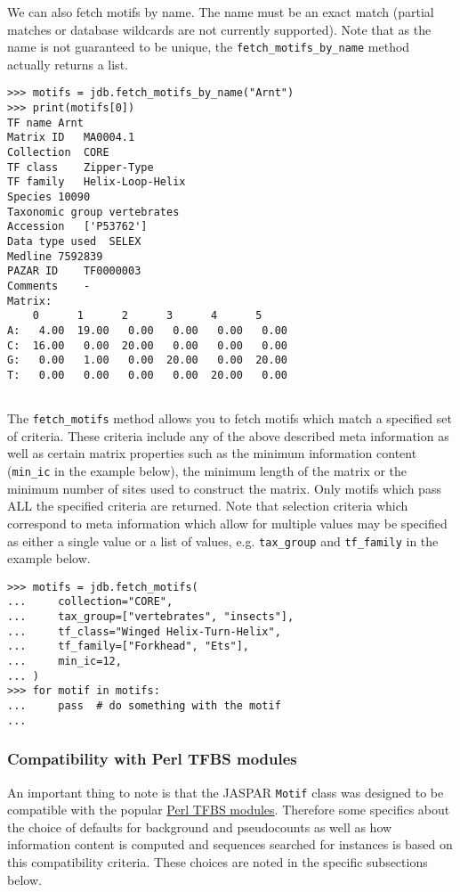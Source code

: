 We can also fetch motifs by name. The name must be an exact match (partial matches or database wildcards are not currently supported). Note that as the name is not guaranteed to be unique, the \verb+fetch_motifs_by_name+ method actually returns a list.
\begin{verbatim}
>>> motifs = jdb.fetch_motifs_by_name("Arnt")
>>> print(motifs[0])
TF name	Arnt
Matrix ID	MA0004.1
Collection	CORE
TF class	Zipper-Type
TF family	Helix-Loop-Helix
Species	10090
Taxonomic group	vertebrates
Accession	['P53762']
Data type used	SELEX
Medline	7592839
PAZAR ID	TF0000003
Comments	-
Matrix:
	0      1      2      3      4      5
A:   4.00  19.00   0.00   0.00   0.00   0.00
C:  16.00   0.00  20.00   0.00   0.00   0.00
G:   0.00   1.00   0.00  20.00   0.00  20.00
T:   0.00   0.00   0.00   0.00  20.00   0.00


\end{verbatim}

The \verb+fetch_motifs+ method allows you to fetch motifs which match a specified set of criteria. These criteria include any of the above described meta information as well as certain matrix properties such as the minimum information content (\verb+min_ic+ in the example below), the minimum length of the matrix or the minimum number of sites used to construct the matrix. Only motifs which pass ALL the specified criteria are returned. Note that selection criteria which correspond to meta information which allow for multiple values may be specified as either a single value or a list of values, e.g. \verb+tax_group+ and \verb+tf_family+ in the example below.
\begin{verbatim}
>>> motifs = jdb.fetch_motifs(
...     collection="CORE",
...     tax_group=["vertebrates", "insects"],
...     tf_class="Winged Helix-Turn-Helix",
...     tf_family=["Forkhead", "Ets"],
...     min_ic=12,
... )
>>> for motif in motifs:
...     pass  # do something with the motif
...
\end{verbatim}

\subsubsection*{Compatibility with Perl TFBS modules}

An important thing to note is that the JASPAR \verb+Motif+ class was designed to be compatible with the popular \href{http://tfbs.genereg.net/}{Perl TFBS modules}. Therefore some specifics about the choice of defaults for background and pseudocounts as well as how information content is computed and sequences searched for instances is based on this compatibility criteria. These choices are noted in the specific subsections below.

